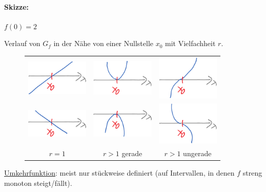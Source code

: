 \clearpage
\paragraph{Skizze:} $f(0)=2$

\clearpage
Verlauf von $G_f$ in der Nähe von einer Nullstelle $x_0$ mit Vielfachheit $r$.
\begin{figure}[h!]
	\centering
	\begin{longtable}{ccc}
		\includegraphics[width=3cm]{Bilder/167} &
		\includegraphics[width=3cm]{Bilder/168} &
		\includegraphics[width=3cm]{Bilder/169} \\
		
		\includegraphics[width=3cm]{Bilder/170} &
		\includegraphics[width=3cm]{Bilder/171} &
		\includegraphics[width=3cm]{Bilder/172} \\
		
		$r=1$ & $r>1$ gerade & $r>1$ ungerade \\
	\end{longtable}
	\caption{}
\end{figure}

\ul{Umkehrfunktion}: meist nur stückweise definiert (auf Intervallen, in denen $f$ streng monoton steigt/fällt).

